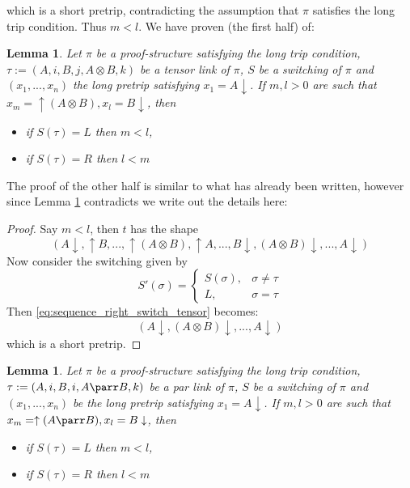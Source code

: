 \documentclass[12pt]{article}
\theoremstyle{plain}
\newtheorem{lemma}[thm]{Lemma}
\theoremstyle{definition}
\begin{document}
which is a short pretrip, contradicting the assumption that $\pi$ satisfies the long trip condition. Thus $m < l$. We have proven (the first half) of:
\begin{lemma}\label{lem:stays_contained_tensor}
Let $\pi$ be a proof-structure satisfying the long trip condition, $\tau := (A,i,B,j, A \otimes B,k)$ be a tensor link of $\pi$, $S$ be a switching of $\pi$ and $(x_1,...,x_n)$ the long pretrip satisfying $x_1 = A \downarrow$. If $m,l > 0$ are such that $x_m = \uparrow (A \otimes B), x_l = B \downarrow$, then
\begin{itemize}
    \item if $S(\tau) = L$ then $m < l$,
    \item if $S(\tau) = R$ then $l < m$
\end{itemize}
\end{lemma}
The proof of the other half is similar to what has already been written, however since Lemma \ref{lem:stays_contained_tensor} contradicts \cite[Lemma 2.9.1]{linearlogic} we write out the details here:
\begin{proof}
Say $m < l$, then $t$ has the shape
\begin{equation}\label{eq:sequence_right_switch_tensor}
(A\downarrow, \uparrow B, ..., \uparrow (A \otimes B), \uparrow A, ..., B \downarrow, (A \otimes B)\downarrow, ..., A\downarrow)
\end{equation}
Now consider the switching given by
\[
S'(\sigma) = 
\begin{cases}
S(\sigma),& \sigma \neq \tau\\
L, & \sigma = \tau
\end{cases}
\]
Then \eqref{eq:sequence_right_switch_tensor} becomes:
\begin{equation}
    (A\downarrow, (A \otimes B)\downarrow,..., A\downarrow)
\end{equation}
which is a short pretrip.
\end{proof}
\begin{lemma}\label{lem:stays_contained_par}
Let $\pi$ be a proof-structure satisfying the long trip condition, $\tau := (A,i,B,i,A\parr B, k)$ be a par link of $\pi$, $S$ be a switching of $\pi$ and $(x_1,...,x_n)$ be the long pretrip satisfying $x_1 = A\downarrow$. If $m,l > 0$ are such that $x_m = \uparrow (A \parr B), x_l = B\downarrow$, then
\begin{itemize}
    \item if $S(\tau) = L$ then $m < l$,
    \item if $S(\tau) = R$ then $l < m$
\end{itemize}
\end{lemma}
\end{document}
